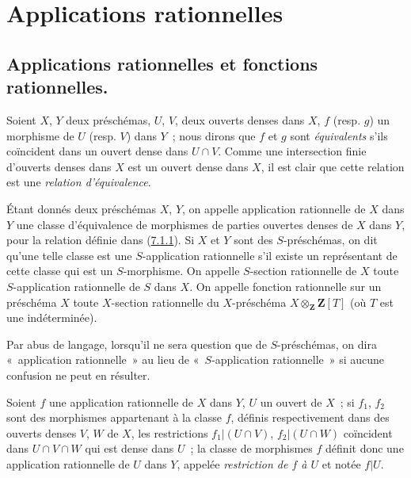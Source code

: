 \section{Applications rationnelles}
\label{section:I.7-fr}

\subsection{Applications rationnelles et fonctions rationnelles.}
\label{subsection:I.7.1-fr}

\begin{env}[7.1.1]
\label{I.7.1.1-fr}
Soient $X$, $Y$ deux préschémas, $U$, $V$, deux ouverts denses dans $X$, $f$
(resp. $g$) un morphisme de $U$ (resp. $V$) dans $Y$~; nous dirons que $f$ et
$g$ sont
\emph{équivalents} s'ils coïncident dans un ouvert dense dans $U\cap V$.
Comme une intersection finie d'ouverts denses dans $X$ est un ouvert dense
dans $X$, il est clair que cette relation est une
\emph{relation d'équivalence}.
\end{env}

\begin{definition}[7.1.2]
\label{I.7.1.2-fr}
Étant donnés deux préschémas $X$, $Y$, on appelle
application rationnelle de $X$ dans $Y$ une classe d'équivalence de
morphismes de parties ouvertes denses de $X$ dans $Y$, pour la relation
définie dans \textup{(\hyperref[I.7.1.1-fr]{7.1.1})}. Si $X$ et $Y$ sont des
$S$-préschémas, on dit qu'une telle classe est une
$S$-application rationnelle s'il existe un représentant de cette classe
qui est un $S$-morphisme. On appelle
$S$-section rationnelle de $X$ toute $S$-application rationnelle de $S$
dans $X$. On appelle
fonction rationnelle sur un préschéma $X$ toute $X$-section rationnelle
du $X$-préschéma $X\otimes_{\mathbf{Z}}\mathbf{Z}[T]$ (où $T$ est une
indéterminée).
\end{definition}

Par abus de langage, lorsqu'il ne sera question que de $S$-préschémas, on dira
«~application rationnelle~» au lieu de «~$S$-application rationnelle~» si
aucune confusion ne peut en résulter.

Soient $f$ une application rationnelle de $X$ dans $Y$, $U$ un ouvert de
$X$~; si $f_1$, $f_2$ sont des morphismes appartenant à la classe $f$, définis
respectivement dans des ouverts denses $V$, $W$ de $X$, les restrictions
$f_1|(U\cap V)$, $f_2|(U\cap W)$ coïncident dans $U\cap V\cap W$ qui est dense
dans $U$~; la classe de morphismes $f$ définit donc une application rationnelle
de $U$ dans $Y$, appelée
\emph{restriction de $f$ à $U$} et notée $f|U$.

